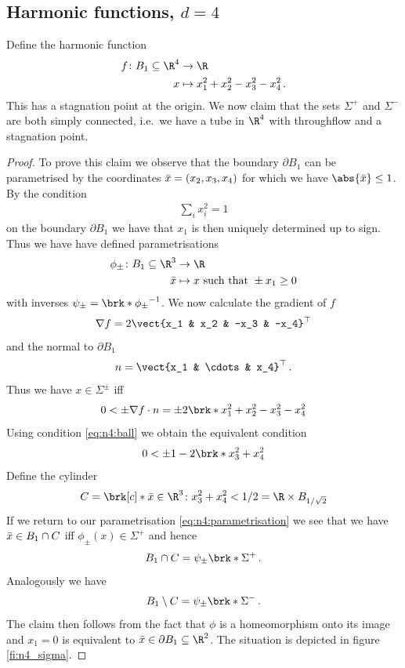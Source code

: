 \newpage

\subsection{Harmonic functions, $d=4$} 
Define the harmonic function 
\begin{align*}
  f\colon B_1\subseteq\R^4&\to \R \\
  x &\mapsto x_1^2+x_2^2-x_3^2-x_4^2\,.
\end{align*}
This has a stagnation point at the origin. We now claim that the sets $\Sigma^+$ and $\Sigma^-$ are both simply connected, i.e.\
we have a tube in $\R^4$ with throughflow and a stagnation point.

\begin{proof}
To prove this claim we observe that the boundary $\partial B_1$ can be parametrised by the coordinates $\bar{x} = (x_2,x_3,x_4)$
for which we have $\abs{\bx}\leq 1$. By the condition
\begin{align}
  \sum_i x_i^2 = 1\label{eq:n4:ball}
\end{align}
on the boundary $\partial B_1$ we have that $x_1$ is then uniquely determined up to sign. Thus we have have defined parametrisations
\begin{align}
  \begin{aligned}\phi_\pm\colon B_1\subseteq\R^3&\to\R \\
  \bx&\mapsto x\text{ such that } \pm x_1\geq0
  \end{aligned}\label{eq:n4:parametrisation}
\end{align}
with inverses $\psi_\pm = \brk*{\phi_\pm}^{-1}$.
We now calculate the gradient of $f$
\begin{align*}
  \nabla f = 2\vect{x_1 & x_2 & -x_3 & -x_4}^\top
\end{align*}
and the normal to $\partial B_1$
\begin{align*}
  n = \vect{x_1 & \cdots & x_4}^\top\,.
\end{align*}
Thus we have $x\in\Sigma^\pm$ iff
\begin{align*}
  0<\pm \nabla f\cdot n = \pm 2\brk*{x_1^2+x_2^2-x_3^2-x_4^2}
\end{align*}
Using condition \eqref{eq:n4:ball} we obtain the equivalent condition
\begin{align*}
  0<\pm 1-2\brk*{x_3^2+x_4^2}
\end{align*}
Define the cylinder
\begin{align*}
  C = \brk[c]*{\bx\in \R^3\colon x_3^2+x_4^2<1/2} = \R\times B_{1/\sqrt{2}}
\end{align*}
If we return to our parametrisation \eqref{eq:n4:parametrisation} we see that we have $\bar{x}\in B_1\cap C$ iff
$\phi_\pm(x)\in \Sigma^+$ and hence 
\begin{align*}
  B_1\cap C=\psi_\pm\brk*{\Sigma^+}\,.
\end{align*}
Analogously  we have 
\begin{align*}
  B_1\setminus C=\psi_\pm\brk*{\Sigma^-}\,.
\end{align*}
The claim then follows from the fact that $\phi$ is a homeomorphism onto its image and $x_1=0$ is 
equivalent to $\bx\in \partial B_1\subseteq \R^2$. The situation is depicted in figure \ref{fi:n4_sigma}.


\end{proof}
